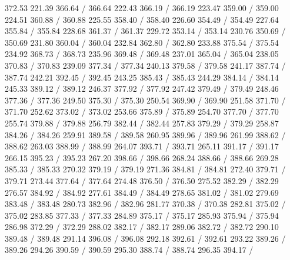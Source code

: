 { 372.53 221.39 366.64 /
 366.64 222.43 366.19 /
 366.19 223.47 359.00 /
 359.00 224.51 360.88 /
 360.88 225.55 358.40 /
 358.40 226.60 354.49 /
 354.49 227.64 355.84 /
 355.84 228.68 361.37 /
 361.37 229.72 353.14 /
 353.14 230.76 350.69 /
 350.69 231.80 360.04 /
 360.04 232.84 362.80 /
 362.80 233.88 375.54 /
 375.54 234.92 368.73 /
 368.73 235.96 369.48 /
 369.48 237.01 365.04 /
 365.04 238.05 370.83 /
 370.83 239.09 377.34 /
 377.34 240.13 379.58 /
 379.58 241.17 387.74 /
 387.74 242.21 392.45 /
 392.45 243.25 385.43 /
 385.43 244.29 384.14 /
 384.14 245.33 389.12 /
 389.12 246.37 377.92 /
 377.92 247.42 379.49 /
 379.49 248.46 377.36 /
 377.36 249.50 375.30 /
 375.30 250.54 369.90 /
 369.90 251.58 371.70 /
 371.70 252.62 373.02 /
 373.02 253.66 375.89 /
 375.89 254.70 377.70 /
 377.70 255.74 379.88 /
 379.88 256.79 382.44 /
 382.44 257.83 379.29 /
 379.29 258.87 384.26 /
 384.26 259.91 389.58 /
 389.58 260.95 389.96 /
 389.96 261.99 388.62 /
 388.62 263.03 388.99 /
 388.99 264.07 393.71 /
 393.71 265.11 391.17 /
 391.17 266.15 395.23 /
 395.23 267.20 398.66 /
 398.66 268.24 388.66 /
 388.66 269.28 385.33 /
 385.33 270.32 379.19 /
 379.19 271.36 384.81 /
 384.81 272.40 379.71 /
 379.71 273.44 377.64 /
 377.64 274.48 376.50 /
 376.50 275.52 382.29 /
 382.29 276.57 384.92 /
 384.92 277.61 384.49 /
 384.49 278.65 381.02 /
 381.02 279.69 383.48 /
 383.48 280.73 382.96 /
 382.96 281.77 370.38 /
 370.38 282.81 375.02 /
 375.02 283.85 377.33 /
 377.33 284.89 375.17 /
 375.17 285.93 375.94 /
 375.94 286.98 372.29 /
 372.29 288.02 382.17 /
 382.17 289.06 382.72 /
 382.72 290.10 389.48 /
 389.48 291.14 396.08 /
 396.08 292.18 392.61 /
 392.61 293.22 389.26 /
 389.26 294.26 390.59 /
 390.59 295.30 388.74 /
 388.74 296.35 394.17 /
}
